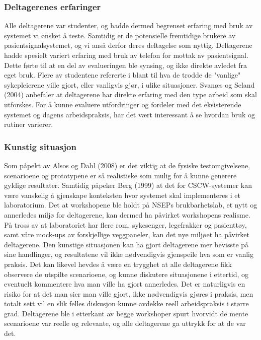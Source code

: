\subsubsection{Deltagerenes erfaringer}
Alle deltagerene var studenter, og hadde dermed begrenset erfaring med bruk av systemet vi ønsket å teste. Samtidig er de potensielle fremtidige brukere av pasientsignalsystemet, og vi anså derfor deres deltagelse som nyttig. Deltagerene hadde spesielt variert erfaring med bruk av telefon for mottak av pasientsignal. Dette førte til at en del av evalueringen ble synsing, og ikke direkte avledet fra eget bruk. Flere av studentene refererte i blant til hva de trodde de "vanlige" sykepleierene ville gjort, eller vanligvis gjør, i ulike situasjoner. Svanæs og Seland (2004) anbefaler at deltagerene har direkte erfaring med den type arbeid som skal utforskes. For å kunne evaluere utfordringer og fordeler med det eksisterende systemet og dagens arbeidspraksis, har det vært interessant å se hvordan bruk og rutiner varierer. 

\subsubsection{Kunstig situasjon}
Som påpekt av Alsos og Dahl (2008) er det viktig at de fysiske testomgivelsene, scenarioene og prototypene er så realistiske som mulig for å kunne generere gyldige resultater. Samtidig påpeker Berg (1999) at det for CSCW-systemer kan være vanskelig å gjenskape konteksten hvor systemet skal implementeres i et laboratorium. Det at workshopene ble holdt på NSEPs brukbarhetslab, et nytt og annerledes miljø for deltagerene, kan dermed ha påvirket workshopens realisme. På tross av at laboratoriet har flere rom, sykesenger, legefrakker og pasienttøy, samt våre mock-ups av forskjellige veggpaneler, kan det nye miljøet ha påvirket deltagerene. Den kunstige situasjonen kan ha gjort deltagerene mer bevisste på sine handlinger, og resultatene vil ikke nødvendigvis gjenspeile hva som er vanlig praksis. Det kan likevel hevdes å være en trygghet at alle deltagerene fikk observere de utspilte scenarioene, og kunne diskutere situasjonene i ettertid, og eventuelt kommentere hva man ville ha gjort annerledes. Det er naturligvis en risiko for at det man sier man ville gjort, ikke nødvendigvis gjøres i praksis, men totalt sett vil en slik felles diskusjon kunne avdekke reell arbeidspraksis i større grad. Deltagerene ble i etterkant av begge workshoper spurt hvorvidt de mente scenarioene var reelle og relevante, og alle deltagerene ga uttrykk for at de var det.


